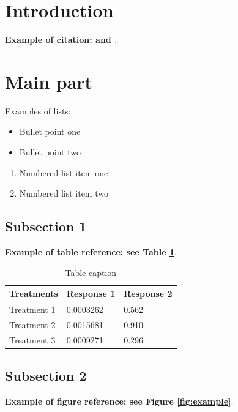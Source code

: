 \documentclass{article}
\begin{document}
  
  \section{Introduction}
  
  \textbf{Example of citation: \cite{Smith_2013} and \cite{Smith_2012}}. \lipsum[2]
  
  \section{Main part}
  \label{S:1}
  \lipsum[9]
  
  Examples of lists:
  \begin{itemize}
  \item Bullet point one
  \item Bullet point two
  \end{itemize}
  
  \begin{enumerate}
  \item Numbered list item one
  \item Numbered list item two
  \end{enumerate}
  
  \subsection{Subsection 1}
  
  \textbf{Example of table reference: see Table \ref{tab:example}}.
  \lipsum[4]
  
  \begin{table}[h] 
  \centering
  \begin{tabular}{l l l}
  \hline
  \textbf{Treatments} & \textbf{Response 1} & \textbf{Response 2}\\
  \hline
  Treatment 1 & 0.0003262 & 0.562 \\
  Treatment 2 & 0.0015681 & 0.910 \\
  Treatment 3 & 0.0009271 & 0.296 \\
  \hline
  \end{tabular}
  \caption{Table caption}
  \label{tab:example}
  \end{table}
  
  \subsection{Subsection 2}
  
  \textbf{Example of figure reference: see Figure \ref{fig:example}}. 
  \lipsum[5]
  
\end{document}
